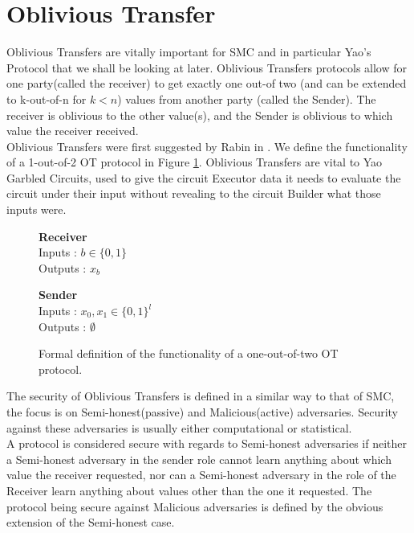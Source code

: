 \documentclass[ %
                    author={Nicholas Tutte},
                supervisor={Prof. Nigel Smart},
                    degree={MEng},
                     title={Secure Two Party Computation},
                  subtitle={A practical comparison of recent protocols},
                      type={Research - GG1K},
                      year={2015} ]{dissertation}
\begin{document}
		\section{Oblivious Transfer} \label{sec:OT_Intro}
			Oblivious Transfers are vitally important for SMC and in particular Yao's Protocol that we shall be looking at later. Oblivious Transfers protocols allow for one party(called the receiver) to get exactly one out-of two (and can be extended to k-out-of-n for $k < n$) values from another party (called the Sender). The receiver is oblivious to the other value(s), and the Sender is oblivious to which value the receiver received.\\

			Oblivious Transfers were first suggested by Rabin in \cite{Rabin81}. We define the functionality of a 1-out-of-2 OT protocol in Figure \ref{fig:OTformalDef}. Oblivious Transfers are vital to Yao Garbled Circuits, used to give the circuit Executor data it needs to evaluate the circuit under their input without revealing to the circuit Builder what those inputs were.\\

			\begin{figure}[!htb]
				\centering
				\begin{minipage}{0.45\textwidth}
					\centering
					\textbf{Receiver}\\
					Inputs : $b \in \{0, 1\}$\\
					Outputs : $x_b$\\
				\end{minipage}
				\begin{minipage}{0.45\textwidth}
					\centering
					\textbf{Sender}\\
					Inputs : $x_0, x_1 \in \{0, 1\}^l$\\
					Outputs : $\emptyset$\\
				\end{minipage}

				\caption{ Formal definition of the functionality of a one-out-of-two OT protocol.\label{fig:OTformalDef}}
			\end{figure}

			The security of Oblivious Transfers is defined in a similar way to that of SMC, the focus is on Semi-honest(passive) and Malicious(active) adversaries. Security against these adversaries is usually either computational or statistical.\\

			A protocol is considered secure with regards to Semi-honest adversaries if neither a Semi-honest adversary in the sender role cannot learn anything about which value the receiver requested, nor can a Semi-honest adversary in the role of the Receiver learn anything about values other than the one it requested. The protocol being secure against Malicious adversaries is defined by the obvious extension of the Semi-honest case.\\
\end{document}
